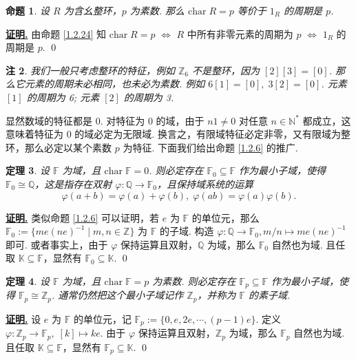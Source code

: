 \documentclass[10pt,openany]{article}
\theoremstyle{thmstyle} %
\newtheorem{theorem}{定理}[subsection]
\theoremstyle{defstyle} %
\theoremstyle{prostyle} %
\newtheorem{proposition}[theorem]{命题}
\theoremstyle{exastyle}
\theoremstyle{remstyle}
\newtheorem{remark}[theorem]{注}
\renewenvironment{proof}[1][证明]{\par\underline{\textbf{#1.}} \;\fangsong}{\qed\par}
\newcommand{\F}{\mathbb{F}}
\newcommand{\tz}{\mathrm{char} \;}
\begin{document}
\begin{proposition}
	设 \( R \) 为含幺整环，\( p \) 为素数. 那么 \( \tz    R=p \) 等价于 \( 1_R \) 的周期是 \( p \). 
\end{proposition}

\begin{proof}
	由命题 \ref{1.2.24}  知 \( \tz    R=p \) \( \Leftrightarrow \) \( R \) 中所有非零元素的周期为 \( p \) \( \Leftrightarrow \) \( 1_R \) 的周期是 \( p \).
\end{proof}

\begin{remark}
	我们一般只考虑整环的特征，例如 \( \mathbb{Z}_6 \) 不是整环，因为 \( [2][3]=[0] \).  那么它元素的周期未必相同，也未必为素数. 例如 \( 6[1]=[0], \; 3[2]=[0] \). 元素 \( [1] \) 的周期为 6; 元素 \( [2] \) 的周期为 3.
\end{remark}

显然数域的特征都是 0. 对特征为 0 的域，由于 \( n 1 \neq 0 \) 对任意 \( n \in \mathbb{N}^* \) 都成立，这意味着特征为 0 的域必定为无限域. 换言之，有限域特征必定非零，又有限域为整环，那么必定以某个素数 \( p \) 为特征. 下面我们给出命题 \ref{1.2.6} 的推广.

\begin{theorem}
	设 \( \F \) 为域，且 \( \tz    \F=0 \). 则必定存在 \( \F_0 \subseteq \F \) 作为最小子域，使得 \( \F_0 \cong \mathbb{Q} \)，这是指存在双射 \( \varphi: \mathbb{Q} \to \F_0 \)，且保持域系统的运算
	\[ \varphi(a+b)=\varphi(a)+\varphi(b), \; \varphi(ab)=\varphi(a)\varphi(b). \]
\end{theorem}

\begin{proof}
	类似命题 \ref{1.2.6} 可以证明，若 \( e \) 为 \( \F \) 的单位元，那么 \( \F_0:=\{me(ne)^{-1} \mid m,n \in \mathbb{Z} \} \) 为 \( \F \) 的子域. 构造 \( \varphi: \mathbb{Q} \to \F_0, m/n \mapsto me(ne)^{-1} \) 即可. 或者事实上，由于 \( \varphi \) 保持运算且双射，\( \mathbb{Q} \) 为域，那么 \( \F_0 \) 自然也为域. 且任取 \( \mathbb{K} \subseteq \F \)，显然有 \( \F_0 \subseteq \mathbb{K} \).
\end{proof}

\begin{theorem}
	设 \( \F \) 为域，且 \( \tz  \F=p \) 为素数. 则必定存在 \( \F_p \subseteq \F \) 作为最小子域，使得 \( \F_p \cong \mathbb{Z}_p \). 通常仍然把这个最小子域记作 \( \mathbb{Z}_p \)，并称为 \( \F \) 的素子域.
\end{theorem}

\begin{proof}
	设 \( e \) 为 \( \F \) 的单位元，记 \( \F_p:=\{0,e,2e,\cdots,(p-1)e\} \). 定义 \( \varphi:\mathbb{Z}_p \to \F_p, \; [k] \mapsto ke \). 由于 \( \varphi \) 保持运算且双射，\( \mathbb{Z}_p \) 为域，那么 \( \F_p \) 自然也为域. 且任取 \( \mathbb{K} \subseteq \F \)，显然有 \( \F_p \subseteq \mathbb{K} \).
\end{proof}
\end{document}
